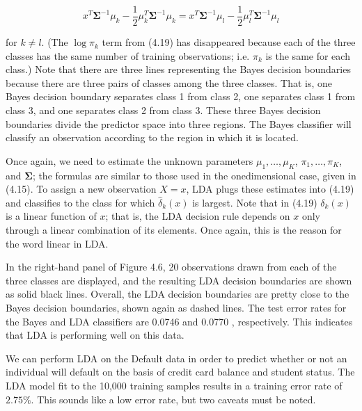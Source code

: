 \documentclass[10pt]{article}
\begin{document}
\begin{equation*}
x^{T} \boldsymbol{\Sigma}^{-1} \mu_{k}-\frac{1}{2} \mu_{k}^{T} \boldsymbol{\Sigma}^{-1} \mu_{k}=x^{T} \boldsymbol{\Sigma}^{-1} \mu_{l}-\frac{1}{2} \mu_{l}^{T} \boldsymbol{\Sigma}^{-1} \mu_{l} \tag{4.20}
\end{equation*}


for $k \neq l$. (The $\log \pi_{k}$ term from (4.19) has disappeared because each of the three classes has the same number of training observations; i.e. $\pi_{k}$ is the same for each class.) Note that there are three lines representing the Bayes decision boundaries because there are three pairs of classes among the three classes. That is, one Bayes decision boundary separates class 1 from class 2, one separates class 1 from class 3, and one separates class 2 from class 3. These three Bayes decision boundaries divide the predictor space into three regions. The Bayes classifier will classify an observation according to the region in which it is located.

Once again, we need to estimate the unknown parameters $\mu_{1}, \ldots, \mu_{K}$, $\pi_{1}, \ldots, \pi_{K}$, and $\boldsymbol{\Sigma}$; the formulas are similar to those used in the onedimensional case, given in (4.15). To assign a new observation $X=x$, LDA plugs these estimates into (4.19) and classifies to the class for which $\hat{\delta}_{k}(x)$ is largest. Note that in (4.19) $\delta_{k}(x)$ is a linear function of $x$; that is, the LDA decision rule depends on $x$ only through a linear combination of its elements. Once again, this is the reason for the word linear in LDA.

In the right-hand panel of Figure 4.6, 20 observations drawn from each of the three classes are displayed, and the resulting LDA decision boundaries are shown as solid black lines. Overall, the LDA decision boundaries are pretty close to the Bayes decision boundaries, shown again as dashed lines. The test error rates for the Bayes and LDA classifiers are 0.0746 and 0.0770 , respectively. This indicates that LDA is performing well on this data.

We can perform LDA on the Default data in order to predict whether or not an individual will default on the basis of credit card balance and student status. The LDA model fit to the 10,000 training samples results in a training error rate of $2.75 \%$. This sounds like a low error rate, but two caveats must be noted.
\end{document}
